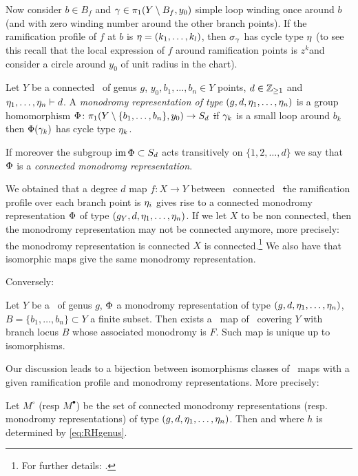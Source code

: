 \documentclass[../main/main.tex]{subfiles}
\begin{document}
Now consider $b\in B_f$ and $\gamma\in\pi_1(Y\setminus B_f,y_0)$ simple loop winding once around $b$ (and with zero winding number around the other branch points). If the ramification profile of $f$ at $b$ is $\eta=(k_1,\ldots,k_l)$, then $\sigma_\gamma$ has cycle type $\eta$ (to see this recall that the local expression of $f$ around ramification points is $z^k$and consider a circle around $y_0$ of unit radius in the chart).

\begin{definition}
	Let $Y$ be a connected \rs\ of genus $g$, $y_0,b_1,\ldots,b_n\in Y$ points, $d\in\mathbb Z_{\geq1}$ and $\eta_1,\ldots,\eta_n\vdash d$. A \emph{monodromy representation of type} $(g,d,\eta_1,\ldots,\eta_n)$ is a group homomorphism $\Phi\colon\pi_1(Y\setminus\{b_1,\ldots,b_n\},y_0)\to S_d$ \st if $\gamma_k$ is a small loop around $b_k$ then $\Phi(\gamma_k)$ has cycle type $\eta_k$.
	
	If moreover the subgroup $\operatorname{im} \Phi\subset S_d$ acts transitively on $\{1,2,\ldots,d\}$ we say that $\Phi$ is a \emph{connected monodromy representation}.
	
\end{definition}

We obtained that a degree $d$ map $f\colon X\to Y$ between \cpt\ connected \rss\ \st the ramification profile over each branch point is $\eta_i$ gives rise to a connected monodromy representation $\Phi$ of type $(g_Y,d,\eta_1,\ldots,\eta_n)$. If we let $X$ to be non connected, then the monodromy representation may not be connected anymore, more precisely: the monodromy representation is connected \tiff $X$ is connected.\footnote{For further details: \cite[§§7.1]{CM}.} We also have that isomorphic maps give the same monodromy representation. 

Conversely:

\begin{theorem}[{\cite[Thm. 7.2.2]{CM}}]
	Let $Y$ be a \rs\ of genus $g$, $\Phi$ a monodromy representation of type $(g,d,\eta_1,\ldots,\eta_n)$, $B=\{b_1,\ldots,b_n\}\subset Y$ a finite subset. Then exists a \holo\ map of \rs\ covering $Y$ with branch locus $B$ whose associated monodromy is $F$. Such map is unique up to isomorphisms. 
\end{theorem}

Our discussion leads to a bijection between isomorphisms classes of \holo\ maps with a given ramification profile and monodromy representations. More precisely:

\begin{theorem}\label{thm:CM7.3.1}
	Let $M^\circ$ (resp $M^\bullet$) be the set of connected monodromy representations (resp. monodromy representations) of type $(g,d,\eta_1,\ldots,\eta_n)$. Then
	and
	where $h$ is determined by \eqref{eq:RHgenus}. 
\end{theorem}
\end{document}
